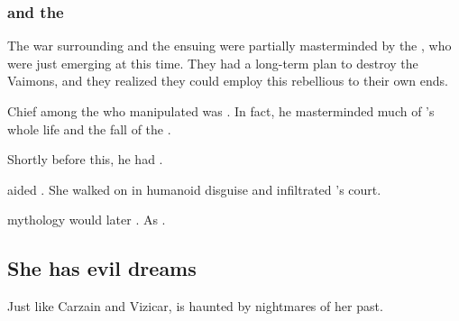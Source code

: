 \subsubsection{\Secherdamon and the \taorthae}
The war surrounding \Belzir and the ensuing \HundredScourges were partially masterminded by the \taorthae, who were just emerging at this time. 
They had a long-term plan to destroy the Vaimons, and they realized they could employ this rebellious \Calipha to their own ends. 

Chief among the \taorthae who manipulated \Belzir was \Secherdamon.
In fact, he masterminded much of \Belzir's whole life and the fall of the \caliphate. 

Shortly before this, he had .

\Nzessuacrith aided \Secherdamon. 
She walked on \Miith in humanoid disguise and infiltrated \Belzir's court. 

\Ortaican mythology would later . 
As . 









\subsection{She has evil dreams}
Just like Carzain and Vizicar, \Belzir{} is haunted by nightmares of her past. 










